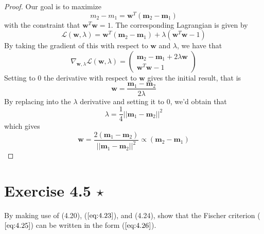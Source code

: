 \begin{proof}
    Our goal is to maximize
    \begin{equation}\label{eq:3.24}\tag{3.24}
        m_2 - m_1 = \mathbf{w}^T(\mathbf{m}_2 - \mathbf{m}_1)
    \end{equation}
    with the constraint that $\mathbf{w}^T\mathbf{w} = 1$.
    The corresponding Lagrangian is given by
    \[
        \mathcal{L}(\mathbf{w}, \lambda) 
        = \mathbf{w}^T(\mathbf{m}_2 - \mathbf{m}_1) + \lambda(\mathbf{w}^T\mathbf{w} - 1)
    \] 
    By taking the gradient of this with respect to $\mathbf{w}$ and $\lambda$,
    we have that
    \[
        \nabla_{\mathbf{w}, \lambda} \mathcal{L}(\mathbf{w}, \lambda) 
        = \begin{pmatrix}
            \mathbf{m}_2 - \mathbf{m}_1 + 2\lambda\mathbf{w} \\
            \mathbf{w}^T\mathbf{w} - 1
        \end{pmatrix}
    \] 
    Setting to 0 the derivative with respect to $\mathbf{w}$ gives the initial result, that is
    \[
        \mathbf{w} = \frac{\mathbf{m}_1 - \mathbf{m}_2}{2\lambda} 
    \] 
    By replacing into the $\lambda$ derivative and setting it to 0, we'd obtain that
     \[
         \lambda = \frac{1}{4} ||\mathbf{m}_1 - \mathbf{m}_2||^2
    \] 
    which gives
    \[
        \mathbf{w} = \frac{2(\mathbf{m}_1 - \mathbf{m}_2)}{||\mathbf{m}_1 - \mathbf{m}_2||^2}
        \propto (\mathbf{m}_2 - \mathbf{m}_1)
    \] 
\end{proof}

\section*{Exercise 4.5 $\star$}
By making use of (4.20), ($\ref{eq:4.23}$), and (4.24), show that the Fischer 
criterion ($\ref{eq:4.25}$) can be written in the form ($\ref{eq:4.26}$).

\vspace{1em}

